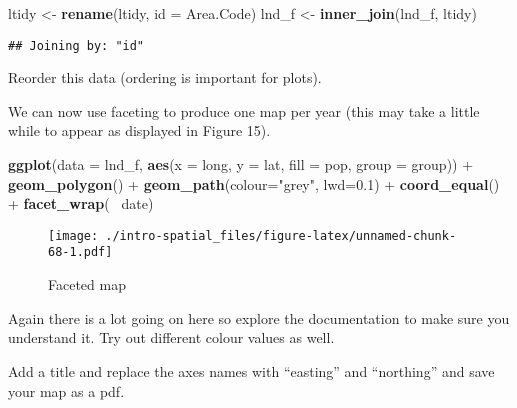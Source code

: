 \documentclass[]{article}
\newenvironment{Shaded}{}{}
\newcommand{\KeywordTok}[1]{\textcolor[rgb]{0.00,0.44,0.13}{\textbf{{#1}}}}
\newcommand{\DataTypeTok}[1]{\textcolor[rgb]{0.56,0.13,0.00}{{#1}}}
\newcommand{\FloatTok}[1]{\textcolor[rgb]{0.25,0.63,0.44}{{#1}}}
\newcommand{\StringTok}[1]{\textcolor[rgb]{0.25,0.44,0.63}{{#1}}}
\newcommand{\NormalTok}[1]{{#1}}
\begin{document}
\begin{Shaded}
\begin{Highlighting}[]
\NormalTok{ltidy <-}\StringTok{ }\KeywordTok{rename}\NormalTok{(ltidy, }\DataTypeTok{id =} \NormalTok{Area.Code)}
\NormalTok{lnd_f <-}\StringTok{ }\KeywordTok{inner_join}\NormalTok{(lnd_f, ltidy)}
\end{Highlighting}
\end{Shaded}

\begin{verbatim}
## Joining by: "id"
\end{verbatim}

Reorder this data (ordering is important for plots).

\begin{Shaded}
\end{Shaded}

We can now use faceting to produce one map per year (this may take a
little while to appear as displayed in Figure 15).

\begin{Shaded}
\begin{Highlighting}[]
\KeywordTok{ggplot}\NormalTok{(}\DataTypeTok{data =} \NormalTok{lnd_f,}
  \KeywordTok{aes}\NormalTok{(}\DataTypeTok{x =} \NormalTok{long, }\DataTypeTok{y =} \NormalTok{lat, }\DataTypeTok{fill =} \NormalTok{pop, }\DataTypeTok{group =} \NormalTok{group)) +}
\StringTok{  }\KeywordTok{geom_polygon}\NormalTok{() +}
\StringTok{  }\KeywordTok{geom_path}\NormalTok{(}\DataTypeTok{colour=}\StringTok{"grey"}\NormalTok{, }\DataTypeTok{lwd=}\FloatTok{0.1}\NormalTok{) +}
\StringTok{  }\KeywordTok{coord_equal}\NormalTok{() +}
\StringTok{  }\KeywordTok{facet_wrap}\NormalTok{(~}\StringTok{ }\NormalTok{date)}
\end{Highlighting}
\end{Shaded}

\begin{figure}[htbp]
\centering
\texttt{[image: ./intro-spatial\_files/figure-latex/unnamed-chunk-68-1.pdf]}
\caption{Faceted map}
\end{figure}

Again there is a lot going on here so explore the documentation to make
sure you understand it. Try out different colour values as well.

Add a title and replace the axes names with ``easting'' and ``northing''
and save your map as a pdf.
\end{document}
